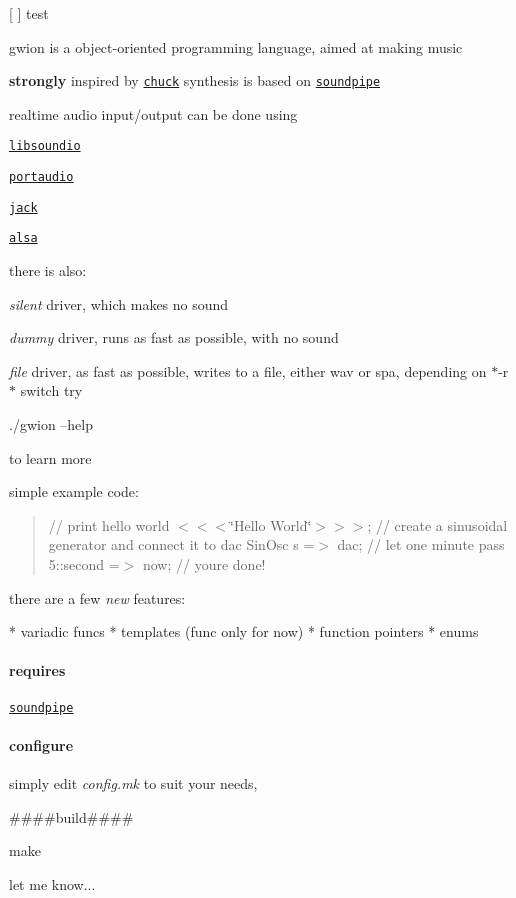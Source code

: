  


\begin{DoxyItemize}
\item \mbox{[} \mbox{]} test
\end{DoxyItemize}

gwion is a object-\/oriented programming language, aimed at making music

{\bfseries strongly} inspired by \href{http://chuck.stanford.edu/}{\tt chuck} synthesis is based on \href{http://paulbatchelor.github.io/proj/soundpipe.html}{\tt soundpipe}

realtime audio input/output can be done using
\begin{DoxyItemize}
\item \href{http://libsound.io/}{\tt libsoundio}
\item \href{http://portaudio.com/}{\tt portaudio}
\item \href{http://jackaudio.org/}{\tt jack}
\item \href{http://alsa-project.org}{\tt alsa}
\end{DoxyItemize}

there is also\+:
\begin{DoxyItemize}
\item {\itshape silent} driver, which makes no sound
\item {\itshape dummy} driver, runs as fast as possible, with no sound
\item {\itshape file} driver, as fast as possible, writes to a file, either wav or spa, depending on $\ast$-\/r$\ast$ switch try 
\begin{DoxyCode}
./gwion --help
\end{DoxyCode}
 to learn more
\end{DoxyItemize}

simple example code\+: \begin{quote}
// print hello world $<$$<$$<$\char`\"{}\+Hello World\char`\"{}$>$$>$$>$; // create a sinusoidal generator and connect it to dac Sin\+Osc s =$>$ dac; // let one minute pass 5\+::second =$>$ now; // you\textquotesingle{}re done! \end{quote}


there are a few {\itshape new} features\+: \begin{DoxyVerb}*  variadic funcs
*  templates (func only for now)
*  function pointers
*  enums
\end{DoxyVerb}


\paragraph*{requires}


\begin{DoxyItemize}
\item \href{https://github.com/PaulBatchelor/Soundpipe}{\tt soundpipe}
\end{DoxyItemize}

\paragraph*{configure}

simply edit {\itshape config.\+mk} to suit your needs,

\#\#\#\#build\#\#\#\# 
\begin{DoxyCode}
make
\end{DoxyCode}


let me know... 